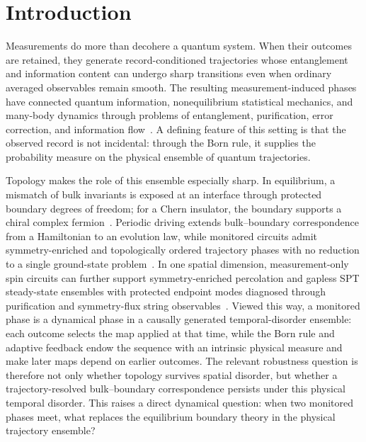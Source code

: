 \documentclass[aps,prx,twocolumn,superscriptaddress,longbibliography,nofootinbib,floatfix]{revtex4-2}
\begin{document}
\section{Introduction}
\label{sec:introduction}

Measurements do more than decohere a quantum system.  When their outcomes are retained, they generate record-conditioned trajectories whose entanglement and information content can undergo sharp transitions even when ordinary averaged observables remain smooth.  The resulting measurement-induced phases have connected quantum information, nonequilibrium statistical mechanics, and many-body dynamics through problems of entanglement, purification, error correction, and information flow~\cite{LiChenFisher2018,LiChenFisher2019,Skinner2019,GullansHuse2020,JianYouVasseur2020,BaoChoiAltman2020,Fisher2023}.  A defining feature of this setting is that the observed record is not incidental: through the Born rule, it supplies the probability measure on the physical ensemble of quantum trajectories.

Topology makes the role of this ensemble especially sharp.  In equilibrium, a mismatch of bulk invariants is exposed at an interface through protected boundary degrees of freedom; for a Chern insulator, the boundary supports a chiral complex fermion~\cite{Hatsugai1993,HasanKane2010}.  Periodic driving extends bulk--boundary correspondence from a Hamiltonian to an evolution law, while monitored circuits admit symmetry-enriched and topologically ordered trajectory phases with no reduction to a single ground-state problem~\cite{Rudner2013,BaoChoiAltman2021,LavasaniAlaviradBarkeshli2021a,LavasaniAlaviradBarkeshli2021b}.  In one spatial dimension, measurement-only spin circuits can further support symmetry-enriched percolation and gapless SPT steady-state ensembles with protected endpoint modes diagnosed through purification and symmetry-flux string observables~\cite{YuYangLiuLinJian2026}.  Viewed this way, a monitored phase is a dynamical phase in a causally generated temporal-disorder ensemble: each outcome selects the map applied at that time, while the Born rule and adaptive feedback endow the sequence with an intrinsic physical measure and make later maps depend on earlier outcomes.  The relevant robustness question is therefore not only whether topology survives spatial disorder, but whether a trajectory-resolved bulk--boundary correspondence persists under this physical temporal disorder.  This raises a direct dynamical question: when two monitored phases meet, what replaces the equilibrium boundary theory in the physical trajectory ensemble?
\end{document}
